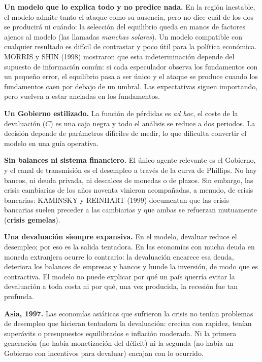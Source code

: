 \documentclass[10pt,a4paper]{article}
\begin{document}
\textbf{Un modelo que lo explica todo y no predice nada.} En la región inestable, el modelo admite tanto el ataque como su ausencia, pero no dice cuál de los dos se producirá ni cuándo: la selección del equilibrio queda en manos de factores ajenos al modelo (las llamadas \textit{manchas solares}). Un modelo compatible con cualquier resultado es difícil de contrastar y poco útil para la política económica. MORRIS y SHIN (1998) mostraron que esta indeterminación depende del supuesto de información común: si cada especulador observa los fundamentos con un pequeño error, el equilibrio pasa a ser único y el ataque se produce cuando los fundamentos caen por debajo de un umbral. Las expectativas siguen importando, pero vuelven a estar ancladas en los fundamentos.

\textbf{Un Gobierno estilizado.} La función de pérdidas es \textit{ad hoc}, el coste de la devaluación ($C$) es una caja negra y todo el análisis se reduce a dos periodos. La decisión depende de parámetros difíciles de medir, lo que dificulta convertir el modelo en una guía operativa.

\textbf{Sin balances ni sistema financiero.} El único agente relevante es el Gobierno, y el canal de transmisión es el desempleo a través de la curva de Phillips. No hay bancos, ni deuda privada, ni descalces de monedas o de plazos. Sin embargo, las crisis cambiarias de los años noventa vinieron acompañadas, a menudo, de crisis bancarias: KAMINSKY y REINHART (1999) documentan que las crisis bancarias suelen preceder a las cambiarias y que ambas se refuerzan mutuamente (\textbf{crisis gemelas}).

\textbf{Una devaluación siempre expansiva.} En el modelo, devaluar reduce el desempleo; por eso es la salida tentadora. En las economías con mucha deuda en moneda extranjera ocurre lo contrario: la devaluación encarece esa deuda, deteriora los balances de empresas y bancos y hunde la inversión, de modo que es contractiva. El modelo no puede explicar por qué un país querría evitar la devaluación a toda costa ni por qué, una vez producida, la recesión fue tan profunda.

\textbf{Asia, 1997.} Las economías asiáticas que sufrieron la crisis no tenían problemas de desempleo que hicieran tentadora la devaluación: crecían con rapidez, tenían superávits o presupuestos equilibrados e inflación moderada. Ni la primera generación (no había monetización del déficit) ni la segunda (no había un Gobierno con incentivos para devaluar) encajan con lo ocurrido.
\end{document}
